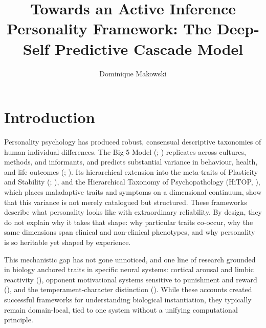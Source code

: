 \documentclass[
  jou,
  floatsintext,
  longtable,
  nolmodern,
  notxfonts,
  notimes,
  12pt,
  colorlinks=true,linkcolor=blue,citecolor=blue,urlcolor=blue]{apa7}
\title{Towards an Active Inference Personality Framework: The Deep-Self
Predictive Cascade Model}
\author{Dominique Makowski}
\begin{document}
\maketitle




\setlength\LTleft{0pt}



\ifdefined\Shaded\renewenvironment{Shaded}{\begin{snugshade}\begin{singlespace}}{\end{singlespace}\end{snugshade}}\fi


\mbox{}\newpage\mbox{}\newpage

\section{Introduction}\label{introduction}

Personality psychology has produced robust, consensual descriptive
taxonomies of human individual differences. The Big-5 Model
(;
) replicates
across cultures, methods, and informants, and predicts substantial
variance in behaviour, health, and life outcomes
(;
). Its hierarchical
extension into the meta-traits of Plasticity and Stability
(;
), and the Hierarchical
Taxonomy of Psychopathology (HiTOP, ), which places maladaptive traits and symptoms on a
dimensional continuum, show that this variance is not merely catalogued
but structured. These frameworks describe what personality looks like
with extraordinary reliability. By design, they do not explain why it
takes that shape: why particular traits co-occur, why the same
dimensions span clinical and non-clinical phenotypes, and why
personality is so heritable yet shaped by experience.

This mechanistic gap has not gone unnoticed, and one line of research
grounded in biology anchored traits in specific neural systems: cortical
arousal and limbic reactivity
(), opponent
motivational systems sensitive to punishment and reward
(), and the
temperament-character distinction
(). While these
accounts created successful frameworks for understanding biological
instantiation, they typically remain domain-local, tied to one system
without a unifying computational principle.
\end{document}
